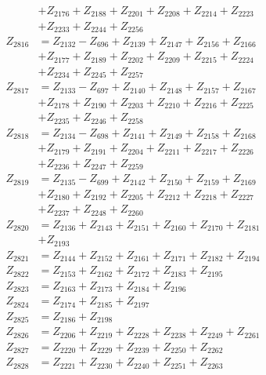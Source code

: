 \begin{multicols}{2}
\begin{align}
&+ Z_{2176} + Z_{2188} + Z_{2201} + Z_{2208} + Z_{2214} + Z_{2223}  \nonumber \\
&+ Z_{2233} + Z_{2244} + Z_{2256} \nonumber \\
Z_{2816} &= Z_{2132} - Z_{696} + Z_{2139} + Z_{2147} + Z_{2156} + Z_{2166}  \nonumber \\
&+ Z_{2177} + Z_{2189} + Z_{2202} + Z_{2209} + Z_{2215} + Z_{2224}  \nonumber \\
&+ Z_{2234} + Z_{2245} + Z_{2257} \nonumber \\
Z_{2817} &= Z_{2133} - Z_{697} + Z_{2140} + Z_{2148} + Z_{2157} + Z_{2167}  \nonumber \\
&+ Z_{2178} + Z_{2190} + Z_{2203} + Z_{2210} + Z_{2216} + Z_{2225}  \nonumber \\
&+ Z_{2235} + Z_{2246} + Z_{2258} \nonumber \\
Z_{2818} &= Z_{2134} - Z_{698} + Z_{2141} + Z_{2149} + Z_{2158} + Z_{2168}  \nonumber \\
&+ Z_{2179} + Z_{2191} + Z_{2204} + Z_{2211} + Z_{2217} + Z_{2226}  \nonumber \\
&+ Z_{2236} + Z_{2247} + Z_{2259} \nonumber \\
Z_{2819} &= Z_{2135} - Z_{699} + Z_{2142} + Z_{2150} + Z_{2159} + Z_{2169}  \nonumber \\
&+ Z_{2180} + Z_{2192} + Z_{2205} + Z_{2212} + Z_{2218} + Z_{2227}  \nonumber \\
&+ Z_{2237} + Z_{2248} + Z_{2260} \nonumber \\
Z_{2820} &= Z_{2136} + Z_{2143} + Z_{2151} + Z_{2160} + Z_{2170} + Z_{2181}  \nonumber \\
&+ Z_{2193} \nonumber \\
Z_{2821} &= Z_{2144} + Z_{2152} + Z_{2161} + Z_{2171} + Z_{2182} + Z_{2194} \nonumber \\
Z_{2822} &= Z_{2153} + Z_{2162} + Z_{2172} + Z_{2183} + Z_{2195} \nonumber \\
Z_{2823} &= Z_{2163} + Z_{2173} + Z_{2184} + Z_{2196} \nonumber \\
Z_{2824} &= Z_{2174} + Z_{2185} + Z_{2197} \nonumber \\
Z_{2825} &= Z_{2186} + Z_{2198} \nonumber \\
Z_{2826} &= Z_{2206} + Z_{2219} + Z_{2228} + Z_{2238} + Z_{2249} + Z_{2261} \nonumber \\
Z_{2827} &= Z_{2220} + Z_{2229} + Z_{2239} + Z_{2250} + Z_{2262} \nonumber \\
Z_{2828} &= Z_{2221} + Z_{2230} + Z_{2240} + Z_{2251} + Z_{2263} \nonumber \\

\end{align}
\end{multicols}
